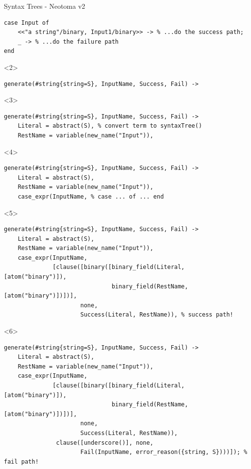 \documentclass[c]{beamer}
\begin{document}
\begin{frame}[fragile,t]{Syntax Trees - Neotoma v2}

    \begin{lstlisting}
case Input of
    <<"a string"/binary, Input1/binary>> -> % ...do the success path;
    _ -> % ...do the failure path
end
    \end{lstlisting}
    \pause
    \begin{onlyenv}<2>
  \begin{lstlisting}
generate(#string{string=S}, InputName, Success, Fail) ->
  \end{lstlisting}
    \end{onlyenv}

    \begin{onlyenv}<3>
  \begin{lstlisting}
generate(#string{string=S}, InputName, Success, Fail) ->
    Literal = abstract(S), % convert term to syntaxTree()
    RestName = variable(new_name("Input")),
  \end{lstlisting}
    \end{onlyenv}

    \begin{onlyenv}<4>
  \begin{lstlisting}
generate(#string{string=S}, InputName, Success, Fail) ->
    Literal = abstract(S),
    RestName = variable(new_name("Input")),
    case_expr(InputName, % case ... of ... end
  \end{lstlisting}
    \end{onlyenv}

    \begin{onlyenv}<5>
  \begin{lstlisting}
generate(#string{string=S}, InputName, Success, Fail) ->
    Literal = abstract(S),
    RestName = variable(new_name("Input")),
    case_expr(InputName,
              [clause([binary([binary_field(Literal, [atom("binary")]),
                               binary_field(RestName, [atom("binary")])])],
                      none,
                      Success(Literal, RestName)), % success path!
  \end{lstlisting}
    \end{onlyenv}
    \begin{onlyenv}<6>
  \begin{lstlisting}
generate(#string{string=S}, InputName, Success, Fail) ->
    Literal = abstract(S),
    RestName = variable(new_name("Input")),
    case_expr(InputName,
              [clause([binary([binary_field(Literal, [atom("binary")]),
                               binary_field(RestName, [atom("binary")])])],
                      none,
                      Success(Literal, RestName)),
               clause([underscore()], none,
                      Fail(InputName, error_reason({string, S})))]); % fail path!
  \end{lstlisting}
    \end{onlyenv}
\end{frame}
\end{document}
